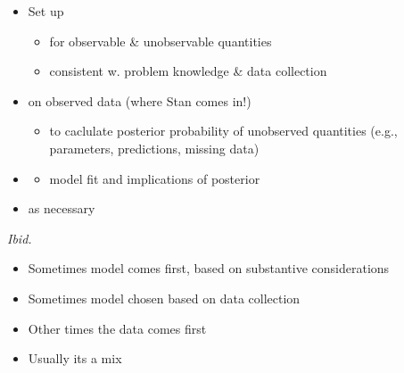 \documentclass[10pt]{report}
\begin{document}
%
\begin{itemize}
\item Set up 
  \vspace*{-4pt}
  \begin{itemize}
  \item for  observable \& unobservable quantities
  \item consistent w. problem knowledge \& data collection
  \end{itemize}
\item {} on observed data (where Stan comes in!)
  \vspace*{-4pt}
  \begin{itemize}
  \item to caclulate posterior probability of unobserved quantities
    (e.g., parameters, predictions, missing data)
  \end{itemize}
\item {}
  \vspace*{-4pt}
  \begin{itemize}
  \item model fit and implications of posterior
  \end{itemize}
\vfill
\item {} as necessary
\end{itemize}
\vfill\hfill {\footnotesize {\slshape Ibid.}}


%
\begin{itemize}
\item Sometimes model comes first, based on substantive
  considerations
\item Sometimes model chosen based on data collection
\item Other times the data comes first
\hfill
\item Usually its a mix
\end{itemize}
\end{document}
